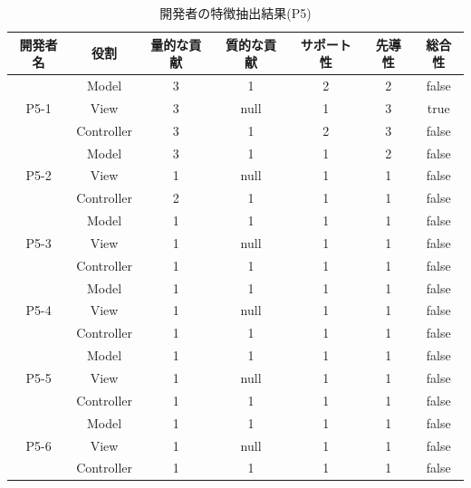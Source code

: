 \documentclass{funthesis}
\begin{document}
\begin{table}[htb]
  \begin{center}
\begin{tabular}{|c|c|c|c|c|c|c|}
\hline
開発者名 & 役割 & 量的な貢献 & 質的な貢献 & サポート性 & 先導性 & 総合性\\ \hline
& Model & 3 & 1 & 2 & 2 & false\\ \cline{2-7}
P5-1 & View & 3 & null & 1 & 3 & true\\ \cline{2-7}
& Controller & 3 & 1 & 2 & 3 & false \\ \hline \hline

& Model & 3 & 1 & 1 & 2 & false\\ \cline{2-7}
P5-2 & View & 1 & null & 1 & 1 & false\\ \cline{2-7}
& Controller & 2 & 1 & 1 & 1 & false \\ \hline \hline

& Model & 1 & 1 & 1 & 1 & false\\ \cline{2-7}
P5-3 & View & 1 & null & 1 & 1 & false\\ \cline{2-7}
& Controller & 1 & 1 & 1 & 1 & false \\ \hline \hline

& Model & 1 & 1 & 1 & 1 & false\\ \cline{2-7}
P5-4 & View & 1 & null& 1 & 1 & false\\ \cline{2-7}
& Controller & 1 & 1 & 1 & 1 & false \\ \hline \hline

& Model & 1 & 1 & 1 & 1 & false\\ \cline{2-7}
P5-5 & View & 1 & null & 1 & 1 & false\\ \cline{2-7}
& Controller & 1 & 1 & 1 & 1 & false \\ \hline \hline

& Model & 1 & 1 & 1 & 1 & false\\ \cline{2-7}
P5-6 & View & 1 & null & 1 & 1 & false\\ \cline{2-7}
& Controller & 1 & 1 & 1 & 1 & false \\ \hline
\end{tabular}
  \end{center}
  \caption{開発者の特徴抽出結果(P5)}    \label{sample}
\end{table}
\end{document}

